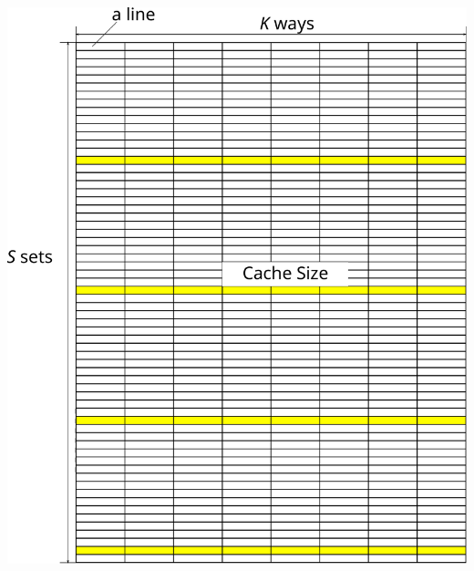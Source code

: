 \documentclass[12pt,dvipdfmx]{beamer}
\begin{document}
\begin{frame}
\begin{columns}
  \begin{column}{0.4\textwidth}
    \begin{center}
      \includegraphics[width=1.0\textwidth]{out/pdf/svg/conflict_3.pdf}
    \end{center}
  \end{column}
\end{columns}
\end{frame}
\end{document}
